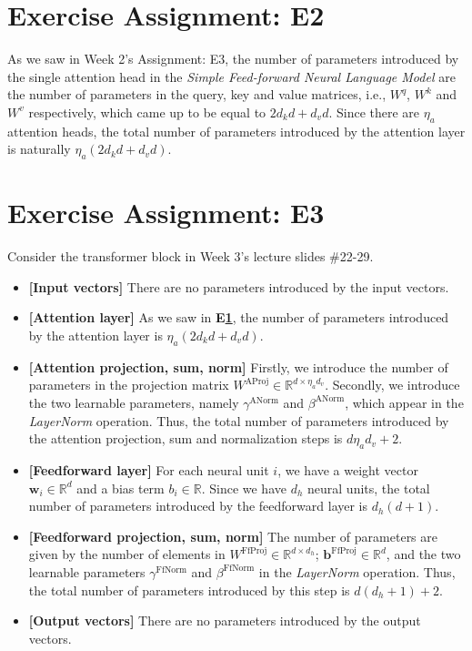 \documentclass{article}
\begin{document}
\section{Exercise Assignment: E2}\label{sec:e2}
As we saw in Week 2's Assignment: E3, the number of parameters introduced by the single attention head in the \textit{Simple Feed-forward Neural Language Model} are the number of parameters in the query, key and value matrices, i.e., $W^q$, $W^k$ and $W^v$ respectively, which came up to be equal to $2d_kd + d_vd$. Since there are $\eta_a$ attention heads, the total number of parameters introduced by the attention layer is naturally $\eta_a(2d_kd + d_vd)$.

\section{Exercise Assignment: E3}\label{sec:e3}
Consider the transformer block in Week 3's lecture slides \#22-29.
\begin{itemize}
    \item \textbf{[Input vectors]} There are no parameters introduced by the input vectors.
    \item \textbf{[Attention layer]} As we saw in \textbf{E\ref{sec:e2}}, the number of parameters introduced by the attention layer is $\eta_a(2d_kd + d_vd)$.
    \item \textbf{[Attention projection, sum, norm]} Firstly, we introduce the number of parameters in the projection matrix \( W^{\text{AProj}} \in \mathbb{R}^{d \times \eta_a d_v} \). Secondly, we introduce the two learnable parameters, namely $\gamma^{\text{ANorm}}$ and $\beta^{\text{ANorm}}$, which appear in the \textit{LayerNorm} operation. Thus, the total number of parameters introduced by the attention projection, sum and normalization steps is $d \eta_a d_v + 2$.
    \item \textbf{[Feedforward layer]} For each neural unit $i$, we have a weight vector $\mathbf{w}_i \in \mathbb{R}^d$ and a bias term $b_i \in \mathbb{R}$. Since we have $d_h$ neural units, the total number of parameters introduced by the feedforward layer is $d_h(d + 1)$.
    \item \textbf{[Feedforward projection, sum, norm]} The number of parameters are given by the number of elements in $W^{\text{FfProj}} \in \mathbb{R}^{d \times d_h}$; $\mathbf{b}^{\text{FfProj}} \in \mathbb{R}^d$, and the two learnable parameters $\gamma^{\text{FfNorm}}$ and $\beta^{\text{FfNorm}}$ in the \textit{LayerNorm} operation. Thus, the total number of parameters introduced by this step is $d(d_h + 1) + 2$.
    \item \textbf{[Output vectors]} There are no parameters introduced by the output vectors.
\end{itemize}
\end{document}
